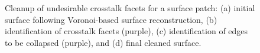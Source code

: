 \begin{figure}[h!]
{\label{fig:cross1-3}}
%
\caption{Cleanup of undesirable crosstalk facets for a surface patch: (a) initial surface following Voronoi-based surface reconstruction, (b) identification of crosstalk facets (purple), (c) identification of edges to be collapsed (purple), and (d) final cleaned surface.}
\label{fig:cross1}
\end{figure}

